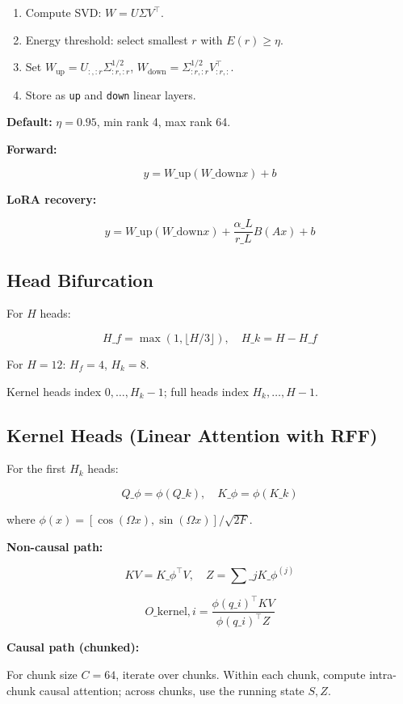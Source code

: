 \begin{enumerate}
\item Compute SVD: $W = U \Sigma V^\top$.
\item Energy threshold: select smallest $r$ with $E(r) \geq \eta$.
\item Set $W_\text{up} = U_{:, :r} \Sigma_{:r, :r}^{1/2}$, $W_\text{down} = \Sigma_{:r, :r}^{1/2} V_{:r, :}^\top$.
\item Store as \texttt{up} and \texttt{down} linear layers.

\end{enumerate}
\textbf{Default:} $\eta = 0.95$, min rank 4, max rank 64.

\textbf{Forward:}

\[
y = W\_\text{up}(W\_\text{down} x) + b
\tag{4.1}
\]

\textbf{LoRA recovery:}

\[
y = W\_\text{up}(W\_\text{down} x) + \frac{\alpha\_L}{r\_L} B(A x) + b
\tag{4.2}
\]

\subsection{Head Bifurcation}

For $H$ heads:

\[
H\_f = \max(1, \lfloor H / 3 \rfloor), \quad H\_k = H - H\_f
\tag{4.3}
\]

For $H = 12$: $H_f = 4$, $H_k = 8$.

Kernel heads index $0, \ldots, H_k - 1$; full heads index $H_k, \ldots, H - 1$.

\subsection{Kernel Heads (Linear Attention with RFF)}

For the first $H_k$ heads:

\[
Q\_\phi = \phi(Q\_k), \quad K\_\phi = \phi(K\_k)
\tag{4.4}
\]

where $\phi(x) = [\cos(\Omega x), \sin(\Omega x)] / \sqrt{2F}$.

\textbf{Non-causal path:}

\[
KV = K\_\phi^\top V, \quad Z = \sum\_j K\_\phi^{(j)}
\tag{4.5}
\]

\[
O\_{\text{kernel}, i} = \frac{\phi(q\_i)^\top KV}{\phi(q\_i)^\top Z}
\tag{4.6}
\]

\textbf{Causal path (chunked):}

For chunk size $C = 64$, iterate over chunks. Within each chunk, compute 
intra-chunk causal attention; across chunks, use the running state $S, Z$.

